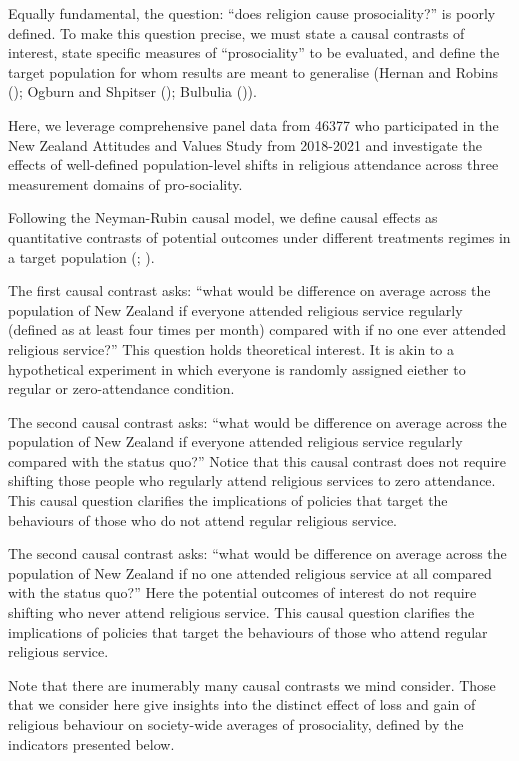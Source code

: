 \documentclass[
  single column]{article}
\begin{document}
Equally fundamental, the question: ``does religion cause prosociality?''
is poorly defined. To make this question precise, we must state a causal
contrasts of interest, state specific measures of ``prosociality'' to be
evaluated, and define the target population for whom results are meant
to generalise (Hernan and Robins
(); Ogburn and Shpitser
(); Bulbulia
()).

Here, we leverage comprehensive panel data from 46377 who participated
in the New Zealand Attitudes and Values Study from 2018-2021 and
investigate the effects of well-defined population-level shifts in
religious attendance across three measurement domains of pro-sociality.

Following the Neyman-Rubin causal model, we define causal effects as
quantitative contrasts of potential outcomes under different treatments
regimes in a target population (;
).

The first causal contrast asks: ``what would be difference on average
across the population of New Zealand if everyone attended religious
service regularly (defined as at least four times per month) compared
with if no one ever attended religious service?'' This question holds
theoretical interest. It is akin to a hypothetical experiment in which
everyone is randomly assigned eiether to regular or zero-attendance
condition.

The second causal contrast asks: ``what would be difference on average
across the population of New Zealand if everyone attended religious
service regularly compared with the status quo?'' Notice that this
causal contrast does not require shifting those people who regularly
attend religious services to zero attendance. This causal question
clarifies the implications of policies that target the behaviours of
those who do not attend regular religious service.

The second causal contrast asks: ``what would be difference on average
across the population of New Zealand if no one attended religious
service at all compared with the status quo?'' Here the potential
outcomes of interest do not require shifting who never attend religious
service. This causal question clarifies the implications of policies
that target the behaviours of those who attend regular religious
service.

Note that there are inumerably many causal contrasts we mind consider.
Those that we consider here give insights into the distinct effect of
loss and gain of religious behaviour on society-wide averages of
prosociality, defined by the indicators presented below.
\end{document}

